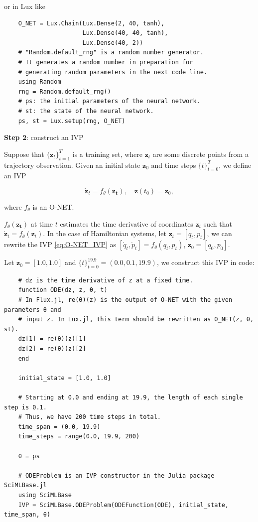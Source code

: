 \documentclass[
	parskip, 			   %
	twoside, 			   %
	DIV=14, 			   %
	BCOR=15.0mm, 		   %
	headsepline, 		   %
	open=right, 		   %
	captions=tableheading, %
	bibliography=totoc,    %
	numbers=noenddot       %
]{scrreprt}
\begin{document}
or in Lux like
\begin{verbatim}
    O_NET = Lux.Chain(Lux.Dense(2, 40, tanh),
                      Lux.Dense(40, 40, tanh),
                      Lux.Dense(40, 2))
    # "Random.default_rng" is a random number generator. 
    # It generates a random number in preparation for 
    # generating random parameters in the next code line.
    using Random
    rng = Random.default_rng()
    # ps: the initial parameters of the neural network.
    # st: the state of the neural network. 
    ps, st = Lux.setup(rng, O_NET)
\end{verbatim}

\textbf{Step 2}: construct an IVP

Suppose that $\{ \mathbf{z}_{t} \}_{t=1}^{T}$ is a training set, where $\mathbf{z}_{t}$ are some discrete points from a trajectory observation. Given an initial state $\mathbf{z}_{0}$ and time steps $\{ t \}_{t=0}^{T}$, we define an IVP

\begin{equation}
    \label{eq:O-NET_IVP}
    \dot{\mathbf{z}}_t = f_{\theta}(\mathbf{z_t}), \quad \mathbf{z}(t_{0}) = \mathbf{z}_{0},
\end{equation}

where $f_{\theta}$ is an O-NET.

$f_{\theta}(\mathbf{z_t})$ at time $t$ estimates the time derivative of coordinates $\dot{\mathbf{z}}_{t}$ such that $\dot{ \mathbf{z}}_{t} = f_{\theta}(\mathbf{z}_t)$. In the case of Hamiltonian systems, let $\mathbf{z}_{t} = [q_{t}, p_{t}]$, we can rewrite the IVP \ref{eq:O-NET_IVP} as $[\dot q_{t}, \dot p_{t}] = f_{\theta}(q_t, p_t)$, $\mathbf{z}_{0}= [q_{0}, p_{0}]$.

Let $\mathbf{z}_{0}=[1.0, 1.0]$ and $\{ t \}_{t=0}^{19.9} = (0.0, 0.1, 19.9)$, we construct this IVP in code:

\begin{verbatim}
    # dz is the time derivative of z at a fixed time.
    function ODE(dz, z, θ, t)
    # In Flux.jl, re(θ)(z) is the output of O-NET with the given parameters θ and
    # input z. In Lux.jl, this term should be rewritten as O_NET(z, θ, st).
    dz[1] = re(θ)(z)[1]
    dz[2] = re(θ)(z)[2]
    end
    
    initial_state = [1.0, 1.0]
    
    # Starting at 0.0 and ending at 19.9, the length of each single step is 0.1.
    # Thus, we have 200 time steps in total.
    time_span = (0.0, 19.9)
    time_steps = range(0.0, 19.9, 200)
    
    θ = ps
    
    # ODEProblem is an IVP constructor in the Julia package SciMLBase.jl
    using SciMLBase
    IVP = SciMLBase.ODEProblem(ODEFunction(ODE), initial_state, time_span, θ)
\end{verbatim}
\end{document}

